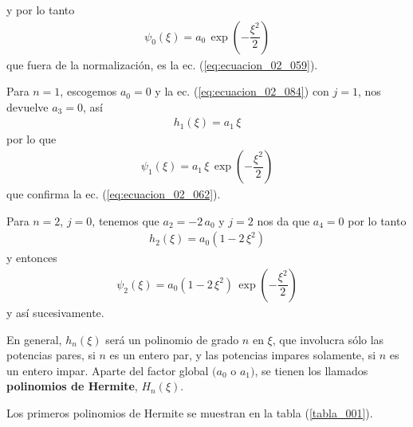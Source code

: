 y por lo tanto
\begin{align*}
\psi_{0} (\xi) = a_{0} \, \exp \left( - \dfrac{\xi^{2}}{2} \right)
\end{align*}
que fuera de la normalización, es la ec. (\ref{eq:ecuacion_02_059}).
\par
Para $n=1$, escogemos $a_{0} = 0$ y la ec. (\ref{eq:ecuacion_02_084}) con $j = 1$, nos devuelve $a_{3} = 0$, así
\begin{align*}
h_{1} (\xi) = a_{1} \, \xi
\end{align*}
por lo que
\begin{align*}
\psi_{1} (\xi) = a_{1} \, \xi \, \exp \left( - \dfrac{\xi^{2}}{2} \right)
\end{align*}
que confirma la ec. (\ref{eq:ecuacion_02_062}).
\par
Para $n = 2$, $j = 0$, tenemos que $a_{2} = - 2 \, a_{0}$ y $j = 2$ nos da que $a_{4} = 0$ por lo tanto
\begin{align*}
h_{2} (\xi) = a_{0} (1 - 2 \, \xi^{2})
\end{align*}
y entonces
\begin{align*}
\psi_{2} (\xi) = a_{0} (1 - 2 \, \xi^{2}) \, \exp \left( - \dfrac{\xi^{2}}{2} \right)
\end{align*}
y así sucesivamente.
\par
En general, $h_{n} (\xi)$ será un polinomio de grado $n$ en $\xi$, que involucra sólo las potencias pares, si $n$ es un entero par, y las potencias impares solamente, si $n$ es un entero impar. Aparte del factor global $(a_{0}$ o $a_{1})$, se tienen los llamados \textbf{polinomios de Hermite}, $H_{n} (\xi)$.
\par
Los primeros polinomios de Hermite se muestran en la tabla (\ref{tabla_001}). 
